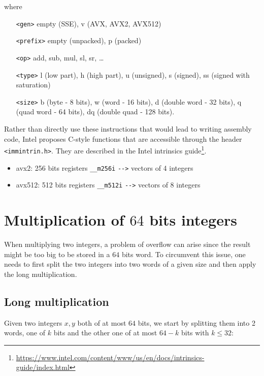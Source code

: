 \documentclass[a4paper]{article}
\begin{document}
where
\begin{center}
    \begin{minipage}{12cm}
        \begin{itemize}
            \item[\texttt{<gen>}] empty (SSE), v (AVX, AVX2, AVX512)
            \item[\texttt{<prefix>}] empty (unpacked), p (packed)
            \item[\texttt{<op>}] add, sub, mul, sl, sr, \dots
            \item[\texttt{<type>}] l (low part), h (high part), u (unsigned), s (signed), ss (signed with saturation)
            \item[\texttt{<size>}] b (byte - 8 bits), w (word - 16 bits), d (double word - 32 bits), q (quad word - 64 bits), 
            dq (double quad - 128 bits).
        \end{itemize}
    \end{minipage}
\end{center}

\bigskip
Rather than directly use these instructions that would lead to writing assembly code, Intel proposes C-style functions that are
accessible through the header \texttt{<immintrin.h>}.
They are described in the Intel intrinsics guide\footnote{\url{https://www.intel.com/content/www/us/en/docs/intrinsics-guide/index.html}}.


\begin{itemize}
    \item avx2: 256 bits registers \texttt{\_\_m256i} \verb+-->+ vectors of 4 integers
    \item avx512: 512 bits registers \texttt{\_\_m512i} \verb+-->+ vectors of 8 integers
\end{itemize}


\section{Multiplication of $64$ bits integers}

When multiplying two integers, a problem of overflow can arise since the result might be too big to be stored in a $64$ bits word. 
To circumvent this issue, one needs to first split the two integers into two words of a given size and then apply the long multiplication.

\subsection{Long multiplication}
Given two integers $x,y$ both of at most $64$ bits, we start by splitting them into 2 words, one of $k$ bits and the other one of at most $64-k$
bits with $k\leq32$:
\end{document}
